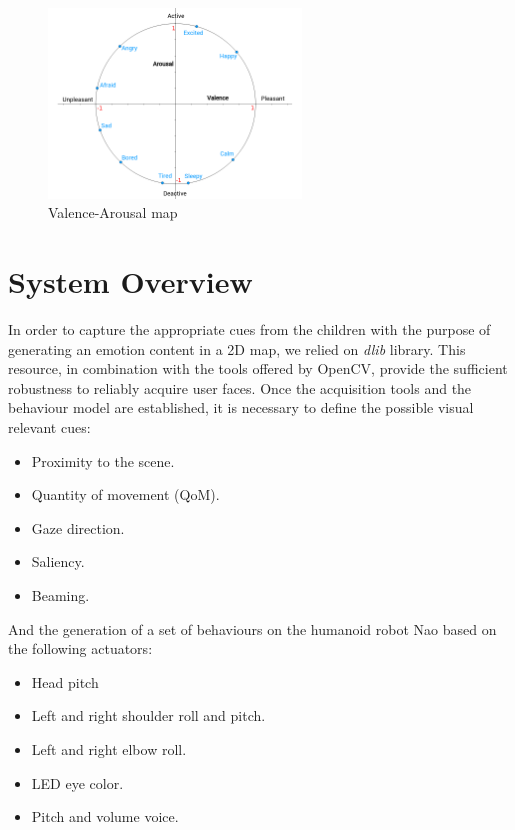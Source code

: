 \begin{figure}[h!]
        \centering
        \includegraphics[width=0.6\textwidth]{figures/vaMap.png}
        \caption{Valence-Arousal map \cite{bradley1999affective}}
        \label{fig:vaMap}
\end{figure} 
  
\section{System Overview} \label{SystemOverview}

In order to capture the appropriate cues from the children with the purpose of generating an emotion content in a 2D map, we relied on \textit{dlib} library. This resource, in combination with the tools offered by OpenCV, provide the sufficient robustness to reliably acquire user faces. Once the acquisition tools and the behaviour model are established, it is necessary to define the possible visual relevant cues: 

\begin{itemize}
  \item Proximity to the scene.
  \item Quantity of movement (QoM).
  \item Gaze direction.
  \item Saliency.
  \item Beaming.
\end{itemize}

And the generation of a set of behaviours on the humanoid robot Nao based on the following actuators:

\begin{itemize} \label{listResources}
  \item Head pitch
  \item Left and right shoulder roll and pitch.
  \item Left and right elbow roll.
  \item LED eye color.
  \item Pitch and volume voice.
\end{itemize}

